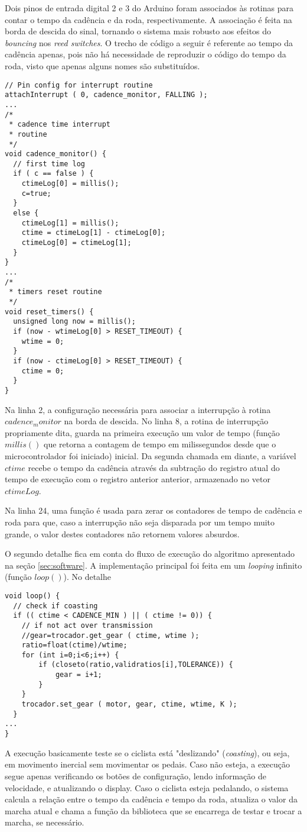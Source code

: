 \documentclass[a4paper,11pt]{article}
\begin{document}
Dois pinos de entrada digital 2 e 3 do Arduino foram associados às
rotinas para contar o tempo da cadência e da roda, respectivamente. A
associação é feita na borda de descida do sinal, tornando o sistema mais
robusto aos efeitos do \textit{bouncing} nos \textit{reed switches}. O
trecho de código a seguir é referente ao tempo da cadência apenas, pois não há
necessidade de reproduzir o código do tempo da roda, visto que apenas alguns
nomes são substituídos.
\begin{lstlisting}
// Pin config for interrupt routine
attachInterrupt ( 0, cadence_monitor, FALLING );
...
/*
 * cadence time interrupt
 * routine
 */
void cadence_monitor() {
  // first time log
  if ( c == false ) {
    ctimeLog[0] = millis();
    c=true;
  }
  else {
    ctimeLog[1] = millis();
    ctime = ctimeLog[1] - ctimeLog[0];
    ctimeLog[0] = ctimeLog[1];
  }
}
...
/*
 * timers reset routine
 */
void reset_timers() {
  unsigned long now = millis();
  if (now - wtimeLog[0] > RESET_TIMEOUT) {
    wtime = 0;
  }
  if (now - ctimeLog[0] > RESET_TIMEOUT) {
    ctime = 0;
  }
}
\end{lstlisting}
Na linha 2, a configuração necessária para associar a interrupção à rotina
$cadence_monitor$ na borda de descida. No linha 8, a rotina de interrupção
propriamente dita, guarda na primeira execução um valor de tempo (função
$millis()$ que retorna a contagem de tempo em milissegundos desde que o
microcontrolador foi iniciado) inicial. Da segunda chamada em diante, a
variável $ctime$ recebe o tempo da cadência através da subtração do registro
atual do tempo de execução com o registro anterior anterior, armazenado no
vetor $ctimeLog$.

Na linha 24, uma função é usada para zerar os contadores de tempo de cadência e
roda para que, caso a interrupção não seja disparada por um tempo muito grande,
o valor destes contadores não retornem valores absurdos.

O segundo detalhe fica em conta do fluxo de execução do algoritmo apresentado
na seção \ref{sec:software}. A implementação principal foi feita em um
\textit{looping} infinito (função $loop()$). No detalhe

\begin{lstlisting}
void loop() {
  // check if coasting
  if (( ctime < CADENCE_MIN ) || ( ctime != 0)) {
    // if not act over transmission
    //gear=trocador.get_gear ( ctime, wtime );
    ratio=float(ctime)/wtime;
    for (int i=0;i<6;i++) {
        if (closeto(ratio,validratios[i],TOLERANCE)) {
            gear = i+1;
        }
    }
    trocador.set_gear ( motor, gear, ctime, wtime, K );
  }
...
}
\end{lstlisting}
A execução basicamente teste se o ciclista está "deslizando"
(\textit{coasting}), ou seja, em movimento inercial sem movimentar os pedais.
Caso não esteja, a execução segue apenas verificando os botões de configuração,
lendo informação de velocidade, e atualizando o display. Caso o ciclista esteja
pedalando, o sistema calcula a relação entre o tempo da cadência e tempo da
roda, atualiza o valor da marcha atual e chama a função da biblioteca que se
encarrega de testar e trocar a marcha, se necessário.
\end{document}
